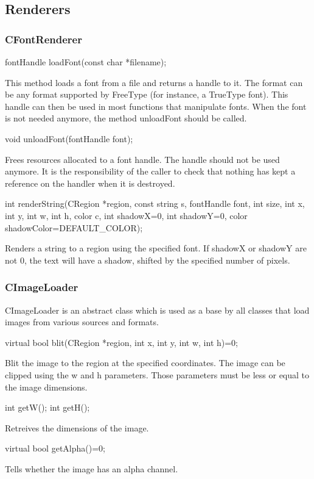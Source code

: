 \documentclass[a4paper,11pt]{journal}
\begin{document}
\subsection{Renderers}
\subsubsection{CFontRenderer}
\begin{verbatimtab}fontHandle loadFont(const char *filename);\end{verbatimtab}
This method loads a font from a file and returns a handle to it. The format can be any format supported by FreeType (for instance, a TrueType font). This handle can then be used in most functions that manipulate fonts. When the font is not needed anymore, the method unloadFont should be called.\\
\begin{verbatimtab}void unloadFont(fontHandle font);\end{verbatimtab}
Frees resources allocated to a font handle. The handle should not be used anymore. It is the responsibility of the caller to check that nothing has kept a reference on the handler when it is destroyed.\\
\begin{verbatimtab}
int renderString(CRegion *region, const string s, fontHandle font,
int size, int x, int y, int w, int h, color c, int shadowX=0, int shadowY=0,
color shadowColor=DEFAULT_COLOR);
\end{verbatimtab}
Renders a string to a region using the specified font.
If shadowX or shadowY are not 0, the text will have a shadow, shifted by the specified number of pixels.

\subsubsection{CImageLoader}
CImageLoader is an abstract class which is used as a base by all classes that load images from various sources and formats. \\
\begin{verbatimtab}virtual bool blit(CRegion *region, int x, int y, int w, int h)=0;\end{verbatimtab}
Blit the image to the region at the specified coordinates. The image can be clipped using the w and h parameters. Those parameters must be less or equal to the image dimensions.\\
\begin{verbatimtab}
int getW();
int getH();
\end{verbatimtab}
Retreives the dimensions of the image.\\
\begin{verbatimtab}virtual bool getAlpha()=0;\end{verbatimtab}
Tells whether the image has an alpha channel.
\end{document}
